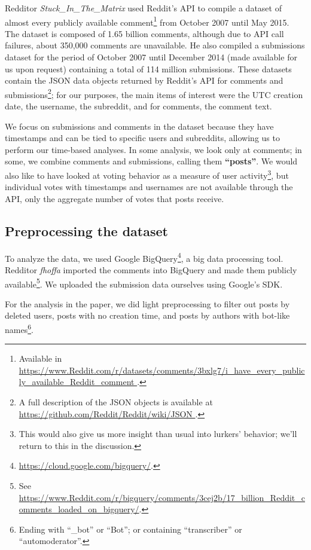 Redditor \textit{Stuck\_In\_The\_Matrix} used Reddit's API to compile a dataset of almost every publicly available comment\footnote{Available in \url{https://www.Reddit.com/r/datasets/comments/3bxlg7/i_have_every_publicly_available_Reddit_comment }.} from October 2007 until May 2015.  The dataset is composed of 1.65 billion comments, although due to API call failures, about 350,000 comments are unavailable.  He also compiled a submissions dataset for the period of October 2007 until December 2014 (made available for us upon request) containing a total of 114 million submissions.  These datasets contain the JSON data objects returned by Reddit's API for comments and submissions\footnote{A full description of the JSON objects is available at \url{https://github.com/Reddit/Reddit/wiki/JSON }.}; for our purposes, the main items of interest were the UTC creation date, the username, the subreddit, and for comments, the comment text.

We focus on submissions and comments in the dataset because they have timestamps and can be tied to specific users and subreddits, allowing us to perform our time-based analyses.   In some analysis, we look only at comments; in some, we combine comments and submissions, calling them \textbf{``posts''}.  We would also like to have looked at voting behavior as a measure of user activity\footnote{This would also give us more insight than usual into lurkers' behavior; we'll return to this in the discussion.}, but individual votes with timestamps and usernames are not available through the API, only the aggregate number of votes that posts receive.

\subsection{Preprocessing the dataset}

To analyze the data, we used Google BigQuery\footnote{\url{https://cloud.google.com/bigquery/}.}, a big data processing tool.
Redditor \textit{fhoffa} imported the comments into BigQuery and made them publicly available\footnote{See \url{https://www.Reddit.com/r/bigquery/comments/3cej2b/17_billion_Reddit_comments_loaded_on_bigquery/}.}.  We uploaded the submission data ourselves using Google's SDK.

For the analysis in the paper, we did light preprocessing to filter out posts by deleted users, posts with no creation time, and posts by authors with bot-like names\footnote{Ending with ``\_bot'' or ``Bot''; or containing ``transcriber'' or ``automoderator''.}.

